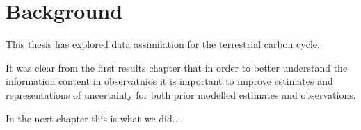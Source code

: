 
\section{Background}

This thesis has explored data assimilation for the terrestrial carbon cycle.  


It was clear from the first results chapter that in order to better understand the information content in observatnios it is important to improve estimates and representations of uncertainty for both prior modelled estimates and observations.

In the next chapter this is what we did...